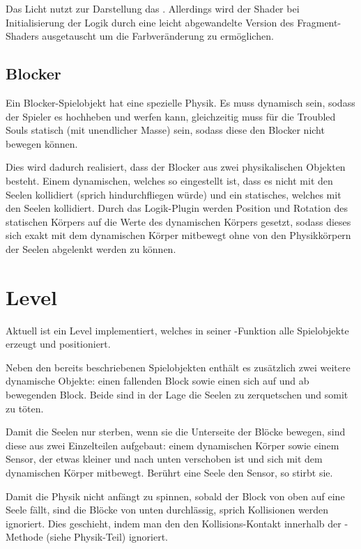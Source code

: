 Das Licht nutzt zur Darstellung das . Allerdings wird der Shader bei Initialisierung der Logik durch eine leicht abgewandelte Version des Fragment-Shaders ausgetauscht um die Farbveränderung zu ermöglichen.

\subsection{Blocker}

Ein Blocker-Spielobjekt hat eine spezielle Physik. Es muss dynamisch sein, sodass der Spieler es hochheben und werfen kann, gleichzeitig muss für die Troubled Souls statisch (mit unendlicher Masse) sein, sodass diese den Blocker nicht bewegen können.

Dies wird dadurch realisiert, dass der Blocker aus zwei physikalischen Objekten besteht. Einem dynamischen, welches so eingestellt ist, dass es nicht mit den Seelen kollidiert (sprich hindurchfliegen würde) und ein statisches, welches mit den Seelen kollidiert. Durch das Logik-Plugin werden Position und Rotation des statischen Körpers auf die Werte des dynamischen Körpers gesetzt, sodass dieses sich exakt mit dem dynamischen Körper mitbewegt ohne von den Physikkörpern der Seelen abgelenkt werden zu können.

\section{Level}

Aktuell ist ein Level implementiert, welches in seiner -Funktion alle Spielobjekte erzeugt und positioniert.

Neben den bereits beschriebenen Spielobjekten enthält es zusätzlich zwei weitere dynamische Objekte: einen fallenden Block sowie einen sich auf und ab bewegenden Block. Beide sind in der Lage die Seelen zu zerquetschen und somit zu töten.

Damit die Seelen nur sterben, wenn sie die Unterseite der Blöcke bewegen, sind diese aus zwei Einzelteilen aufgebaut: einem dynamischen Körper sowie einem Sensor, der etwas kleiner und nach unten verschoben ist und sich mit dem dynamischen Körper mitbewegt. Berührt eine Seele den Sensor, so stirbt sie.

Damit die Physik nicht anfängt zu spinnen, sobald der Block von oben auf eine Seele fällt, sind die Blöcke von unten durchlässig, sprich Kollisionen werden ignoriert. Dies geschieht, indem man den den Kollisions-Kontakt innerhalb der -Methode (siehe Physik-Teil) ignoriert.

